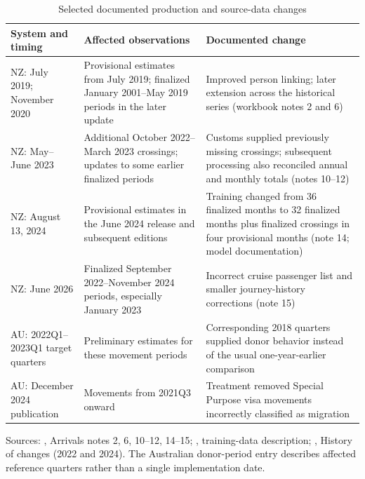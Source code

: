 \begin{table}[htbp]\centering\small
\caption{Selected documented production and source-data changes}\label{tab:chronology}
\begin{tabularx}{\linewidth}{@{}>{\raggedright\arraybackslash}p{.20\linewidth}>{\raggedright\arraybackslash}X>{\raggedright\arraybackslash}X@{}}\toprule
System and timing & Affected observations & Documented change\\\midrule
NZ: July 2019; November 2020 & Provisional estimates from July 2019; finalized January 2001--May 2019 periods in the later update & Improved person linking; later extension across the historical series (workbook notes 2 and 6)\\
NZ: May--June 2023 & Additional October 2022--March 2023 crossings; updates to some earlier finalized periods & Customs supplied previously missing crossings; subsequent processing also reconciled annual and monthly totals (notes 10--12)\\
NZ: August 13, 2024 & Provisional estimates in the June 2024 release and subsequent editions & Training changed from 36 finalized months to 32 finalized months plus finalized crossings in four provisional months (note 14; model documentation)\\
NZ: June 2026 & Finalized September 2022--November 2024 periods, especially January 2023 & Incorrect cruise passenger list and smaller journey-history corrections (note 15)\\
AU: 2022Q1--2023Q1 target quarters & Preliminary estimates for these movement periods & Corresponding 2018 quarters supplied donor behavior instead of the usual one-year-earlier comparison\\
AU: December 2024 publication & Movements from 2021Q3 onward & Treatment removed Special Purpose visa movements incorrectly classified as migration\\\bottomrule
\end{tabularx}
\par\smallskip\begin{minipage}{\linewidth}\footnotesize Sources: \citet{statsnzdata}, Arrivals notes 2, 6, 10--12, 14--15; \citet{statsnzmodel}, training-data description; \citet{abs2025methods}, History of changes (2022 and 2024). The Australian donor-period entry describes affected reference quarters rather than a single implementation date.\end{minipage}
\end{table}
